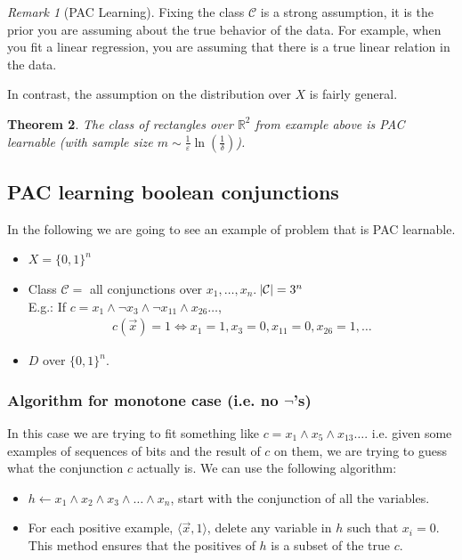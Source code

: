 \documentclass[12pt, letterpaper]{article}
\numberwithin{equation}{section} %
\newcommand{\R}{\mathbb{R}}
\newcommand{\mc}{\mathcal}
\newcommand{\ve}{\varepsilon}
\newtheorem{theorem}{Theorem}[section]
\theoremstyle{definition}
\theoremstyle{remark}
\newtheorem{remark}[theorem]{Remark}
\begin{document}
\begin{remark}[PAC Learning]
    Fixing the class $\mc C$ is a strong assumption, it is the prior you are assuming about the true behavior of the data.
     For example, when you fit a linear regression, you are assuming that there is a true linear relation in the data.
    
    In contrast, the assumption on the distribution over $X$ is fairly general.
\end{remark}

\begin{theorem}
    The class of rectangles over $\R^2$ from example above is PAC learnable (with sample size $m\sim\frac1\ve\ln\left(\frac1\delta\right)$).
\end{theorem}

\subsection{PAC learning boolean conjunctions}

In the following we are going to see an example of problem that is PAC learnable.
\begin{itemize}
    \item $X = \lbrace 0, 1 \rbrace^n$
    \item Class $\mc C = $ all conjunctions over $x_1,\ldots,x_n$. $\abs{\mc C} = 3^n$\\
          E.g.: If $c = x_1\wedge \lnot x_3 \wedge \lnot x_{11} \wedge x_{26} \ldots$,
          \begin{align}
              c(\vec x) = 1 \iff x_1 =1, x_3 = 0, x_{11} = 0, x_{26} = 1, \ldots
          \end{align}
    \item $D$ over $\lbrace 0, 1 \rbrace^n$.
\end{itemize}


\subsubsection[Algorithm for monotone case]{Algorithm for monotone case (i.e. no $\lnot$'s)}

In this case we are trying to fit something like $c = x_1\wedge x_5 \wedge x_{13} \ldots$. i.e. given some examples of sequences of bits and the result of $c$ on them, we are trying to guess what the conjunction $c$ actually is.
We can use the following algorithm:
\begin{itemize}
    \item $h \leftarrow x_1\wedge x_2 \wedge x_3\wedge \ldots \wedge x_n$, start with the conjunction of all the variables.
    \item For each positive example, $\langle \vec x, 1 \rangle$, delete any variable in $h$ such that $x_i=0$.\\
    This method ensures that the positives of $h$ is a subset of the true $c$.
\end{itemize}
\end{document}
